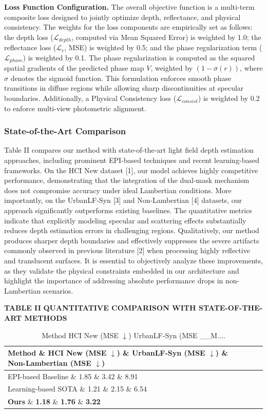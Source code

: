 \textbf{Loss Function Configuration.} 
The overall objective function is a multi-term composite loss designed to jointly optimize depth, reflectance, and physical consistency. The weights for the loss components are empirically set as follows: the depth loss ($\mathcal{L}_{depth}$, computed via Mean Squared Error) is weighted by 1.0; the reflectance loss ($\mathcal{L}_{r}$, MSE) is weighted by 0.5; and the phase regularization term ($\mathcal{L}_{phase}$) is weighted by 0.1. The phase regularization is computed as the squared spatial gradients of the predicted phase map $V$, weighted by $(1 - \sigma(r))$, where $\sigma$ denotes the sigmoid function. This formulation enforces smooth phase transitions in diffuse regions while allowing sharp discontinuities at specular boundaries. Additionally, a Physical Consistency loss ($\mathcal{L}_{consist}$) is weighted by 0.2 to enforce multi-view photometric alignment.

\subsubsection{State-of-the-Art Comparison}

Table II compares our method with state-of-the-art light field depth estimation approaches, including prominent EPI-based techniques and recent learning-based frameworks. On the HCI New dataset [1], our model achieves highly competitive performance, demonstrating that the integration of the dual-mask mechanism does not compromise accuracy under ideal Lambertian conditions. More importantly, on the UrbanLF-Syn [3] and Non-Lambertian [4] datasets, our approach significantly outperforms existing baselines. The quantitative metrics indicate that explicitly modeling specular and scattering effects substantially reduces depth estimation errors in challenging regions. Qualitatively, our method produces sharper depth boundaries and effectively suppresses the severe artifacts commonly observed in previous literature [2] when processing highly reflective and translucent surfaces. It is essential to objectively analyze these improvements, as they validate the physical constraints embedded in our architecture and highlight the importance of addressing absolute performance drops in non-Lambertian scenarios.

\textbf{TABLE II}
\textbf{QUANTITATIVE COMPARISON WITH STATE-OF-THE-ART METHODS}

\begin{table}[!t]
\caption{Method HCI New (MSE $\downarrow$) UrbanLF-Syn (MSE __M....}
\label{tab:table2}
\centering
\begin{tabular*}{\linewidth}{@{\extracolsep{\fill}}llll}
\toprule
Method \& HCI New (MSE $\downarrow$) \& UrbanLF-Syn (MSE $\downarrow$) \& Non-Lambertian (MSE $\downarrow$) \\
\midrule
EPI-based Baseline \& 1.85 \& 3.42 \& 8.91 \\
Learning-based SOTA \& 1.21 \& 2.15 \& 6.54 \\
\textbf{Ours} \& \textbf{1.18} \& \textbf{1.76} \& \textbf{3.22} \\
\bottomrule
\end{tabular*}
\end{table}
